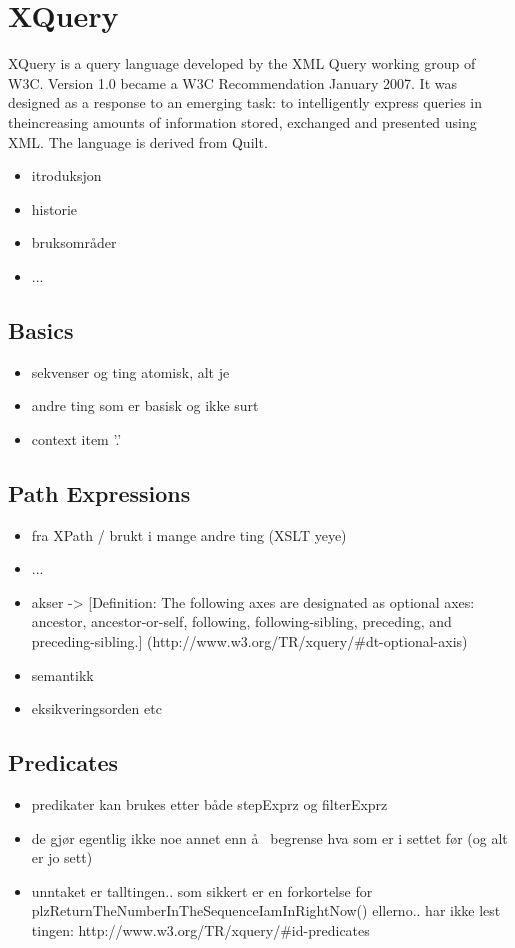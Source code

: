 \section{XQuery}
\label{sect:xquery}

XQuery is a query language developed by the XML Query working group of W3C.
Version 1.0\cite{w3c00} became a W3C Recommendation January 2007. It was designed as a
response to an emerging task: to intelligently express queries in theincreasing
amounts of information stored, exchanged and presented using XML. The language
is derived from Quilt\cite{quilt_queryLanguage}.


\begin{itemize}
\item itroduksjon
\item historie
\item bruksomr\aa der
\item ...
\end{itemize}

\subsection{Basics}
\begin{itemize}
  \item sekvenser og ting atomisk, alt je
  \item andre ting som er basisk og ikke surt
  \item context item '.'
\end{itemize}

\subsection{Path Expressions}
\label{sect:theory:xqueryPathExpressions}
\begin{itemize}
\item fra XPath / brukt i mange andre ting (XSLT yeye)
\item ...
\item akser -> [Definition: The following axes are designated as optional axes:
ancestor, ancestor-or-self, following, following-sibling, preceding, and
preceding-sibling.] (http://www.w3.org/TR/xquery/\#dt-optional-axis)
\item semantikk 
\item eksikveringsorden etc
\end{itemize}

\subsection{Predicates}
\label{sect:theory:xqueryPredicates}
\begin{itemize}
  \item predikater kan brukes etter b\aa de stepExprz og filterExprz
  \item de gj\o r egentlig ikke noe annet enn \aa~ begrense hva som er i settet
  f\o r (og alt er jo sett)
  \item unntaket er talltingen.. som sikkert er en forkortelse for
  plzReturnTheNumberInTheSequenceIamInRightNow() ellerno.. har ikke lest
  tingen: http://www.w3.org/TR/xquery/\#id-predicates
\end{itemize}

